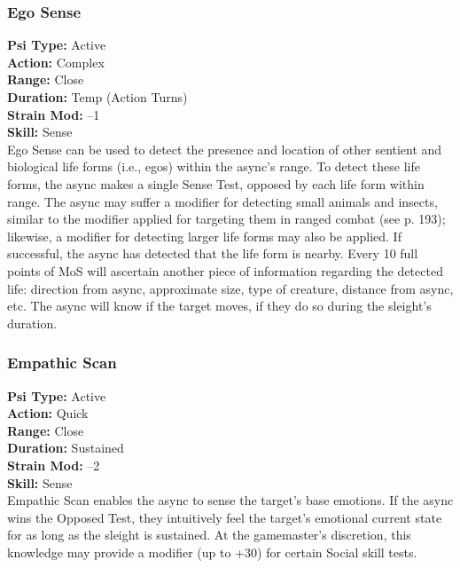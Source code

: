 \subsubsection{Ego Sense}
\textbf{Psi Type:} Active \\ 
\textbf{Action:} Complex \\ 
\textbf{Range:} Close \\ 
\textbf{Duration:} Temp (Action Turns) \\
\textbf{Strain Mod:} –1 \\ 
\textbf{Skill:} Sense\\
Ego Sense can be used to detect the presence and
location of other sentient and biological life forms
(i.e., egos) within the async’s range. To detect these
life forms, the async makes a single Sense Test, opposed
by each life form within range. The async may
suffer a modifier for detecting small animals and
insects, similar to the modifier applied for targeting
them in ranged combat (see p. 193); likewise, a
modifier for detecting larger life forms may also be
applied. If successful, the async has detected that the
life form is nearby. Every 10 full points of MoS will
ascertain another piece of information regarding the
detected life: direction from async, approximate size,
type of creature, distance from async, etc. The async
will know if the target moves, if they do so during the
sleight’s duration.

\subsubsection{Empathic Scan}
\textbf{Psi Type:} Active \\ 
\textbf{Action:} Quick \\ 
\textbf{Range:} Close \\ 
\textbf{Duration:} Sustained \\
\textbf{Strain Mod:} –2 \\ 
\textbf{Skill:} Sense\\
Empathic Scan enables the async to sense the target’s
base emotions. If the async wins the Opposed Test,
they intuitively feel the target’s emotional current state
for as long as the sleight is sustained. At the gamemaster’s
discretion, this knowledge may provide a modifier
(up to +30) for certain Social skill tests.

